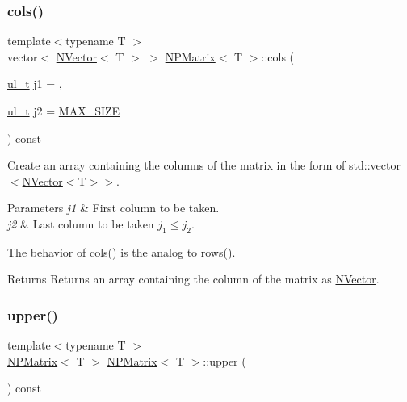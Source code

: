 \subsubsection{\texorpdfstring{cols()}{cols()}}
{\footnotesize\ttfamily template$<$typename T $>$ \\
vector$<$ \mbox{\hyperlink{class_n_vector}{N\+Vector}}$<$ T $>$ $>$ \mbox{\hyperlink{class_n_p_matrix}{N\+P\+Matrix}}$<$ T $>$\+::cols (\begin{DoxyParamCaption}\item[{\mbox{\hyperlink{group___n_algebra_ga1b140a2034db3f5dfe18a987745df43a}{ul\+\_\+t}}}]{j1 = {},  }\item[{\mbox{\hyperlink{group___n_algebra_ga1b140a2034db3f5dfe18a987745df43a}{ul\+\_\+t}}}]{j2 = {\ttfamily \mbox{\hyperlink{_n_vector_8h_a0592dba56693fad79136250c11e5a7fe}{M\+A\+X\+\_\+\+S\+I\+ZE}}} }\end{DoxyParamCaption}) const}



Create an array containing the columns of the matrix in the form of {\ttfamily std\+::vector$<$\mbox{\hyperlink{class_n_vector}{N\+Vector}}$<$T$>$$>$}. 


\begin{DoxyParams}{Parameters}
{\em j1} & First column to be taken. \\
\hline
{\em j2} & Last column to be taken $ j_1 \leq j_2 $.\\
\hline
\end{DoxyParams}
The behavior of {\ttfamily \mbox{\hyperlink{class_n_p_matrix_a30c8ad7b415fa92a23375cbad3ee8e37}{cols()}}} is the analog to {\ttfamily \mbox{\hyperlink{class_n_p_matrix_add861e9e1df81af2546c3eab1fd40d51}{rows()}}}.

\begin{DoxyReturn}{Returns}
Returns an array containing the column of the matrix as {\ttfamily \mbox{\hyperlink{class_n_vector}{N\+Vector}}}. 
\end{DoxyReturn}
\mbox{\label{class_n_p_matrix_a986376cd2765f1864fdac8b264f454ef}} 
\subsubsection{\texorpdfstring{upper()}{upper()}}
{\footnotesize\ttfamily template$<$typename T $>$ \\
\mbox{\hyperlink{class_n_p_matrix}{N\+P\+Matrix}}$<$ T $>$ \mbox{\hyperlink{class_n_p_matrix}{N\+P\+Matrix}}$<$ T $>$\+::upper (\begin{DoxyParamCaption}{ }\end{DoxyParamCaption}) const}




